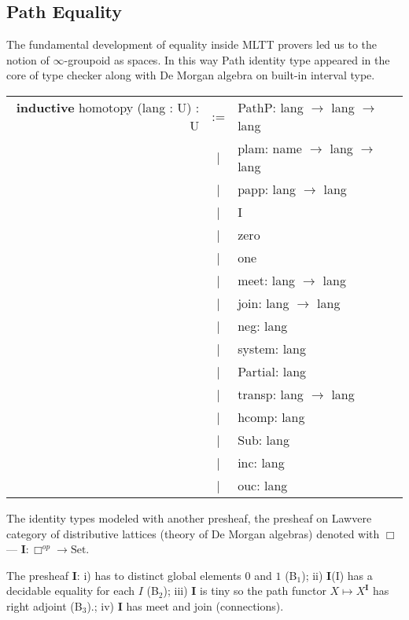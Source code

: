 \documentclass[a4paper,UKenglish,cleveref, autoref, thm-restate]{lipics-v2021}
\newcommand{\tabstyle}[0]{\scriptsize\ttfamily\fontseries{l}\selectfont}
\begin{document}
\newpage
\subsection{Path Equality}

The fundamental development of equality inside MLTT provers led us to the
notion of $\infty$-groupoid as spaces. In this way Path identity type appeared
in the core of type checker along with De Morgan algebra on built-in interval type.

\begin{table}[ht]
\tabstyle
\begin{tabular}{rcl}
  \textbf{inductive} homotopy (lang : U) : U & := & PathP: lang $\rightarrow$ lang $\rightarrow$ lang \\
  &|& plam: name $\rightarrow$ lang $\rightarrow$ lang \\
  &|& papp: lang $\rightarrow$ lang \\
  &|& I \\
  &|& zero \\
  &|& one \\
  &|& meet: lang $\rightarrow$ lang \\
  &|& join: lang $\rightarrow$ lang \\
  &|& neg: lang \\
  &|& system: lang \\
  &|& Partial: lang \\
  &|& transp: lang $\rightarrow$ lang \\
  &|& hcomp: lang \\
  &|& Sub: lang \\
  &|& inc: lang \\
  &|& ouc: lang \\
\end{tabular}
\end{table}

\begin{definition}
The identity types modeled with another presheaf, the presheaf on Lawvere
category of distributive lattices (theory of De Morgan algebras) denoted
with $\Box$ — $\textbf{I} : \Box^{op} \rightarrow \textrm{Set}$.
\end{definition}

\begin{definition} The presheaf $\textbf{I}$:
i) has to distinct global elements $0$ and $1$ (B$_1$);
ii) $\textbf{I}$(I) has a decidable equality for each $I$ (B$_2$);
iii) $\textbf{I}$ is tiny so the path functor $X \mapsto X^\textbf{I}$ has right adjoint (B$_3$).;
iv) $\textbf{I}$ has meet and join (connections).
\end{definition}
\end{document}
